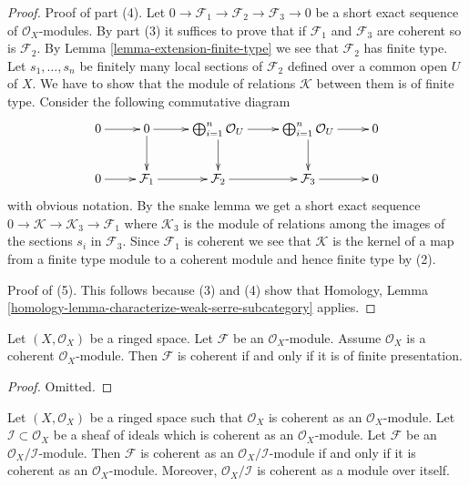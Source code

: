 \begin{proof}
\medskip\noindent
Proof of part (4).
Let $0 \to \mathcal{F}_1 \to \mathcal{F}_2 \to \mathcal{F}_3 \to 0$
be a short exact sequence of $\mathcal{O}_X$-modules. By part
(3) it suffices
to prove that if $\mathcal{F}_1$ and $\mathcal{F}_3$ are coherent
so is $\mathcal{F}_2$. By Lemma \ref{lemma-extension-finite-type} we
see that $\mathcal{F}_2$ has finite type. Let
$s_1, \ldots, s_n$ be finitely many local
sections of $\mathcal{F}_2$ defined over a common open $U$ of $X$.
We have to show that the module of relations $\mathcal{K}$
between them is of finite type.
Consider the following commutative diagram
$$
\xymatrix{
0 \ar[r] &
0 \ar[r] \ar[d] &
\bigoplus_{i = 1}^{n} \mathcal{O}_U \ar[r] \ar[d] &
\bigoplus_{i = 1}^{n} \mathcal{O}_U \ar[r] \ar[d] &
0 \\
0 \ar[r] &
\mathcal{F}_1 \ar[r] &
\mathcal{F}_2 \ar[r] &
\mathcal{F}_3 \ar[r] &
0
}
$$
with obvious notation. By the snake lemma
we get a short exact sequence
$0 \to \mathcal{K} \to \mathcal{K}_3 \to \mathcal{F}_1$
where $\mathcal{K}_3$ is the module of relations among
the images of the sections $s_i$ in $\mathcal{F}_3$.
Since $\mathcal{F}_1$ is coherent we see that
$\mathcal{K}$ is the kernel of a map from a finite type module
to a coherent module and hence finite type by (2).

\medskip\noindent
Proof of (5). This follows because (3) and (4) show that
Homology, Lemma \ref{homology-lemma-characterize-weak-serre-subcategory}
applies.
\end{proof}

\begin{lemma}
\label{lemma-coherent-structure-sheaf}
\begin{reference}
\cite[Chapter I, \S 2, no. 15, Proposition 7, p. 210]{FAC}
\end{reference}
Let $(X, \mathcal{O}_X)$ be a ringed space.
Let $\mathcal{F}$ be an $\mathcal{O}_X$-module.
Assume $\mathcal{O}_X$ is a coherent $\mathcal{O}_X$-module.
Then $\mathcal{F}$ is coherent if and only if it is
of finite presentation.
\end{lemma}

\begin{proof}
Omitted.
\end{proof}

\begin{lemma}
\label{lemma-coherent-change-rings}
\begin{reference}
\cite[Chapter I, \S 2, no. 16, Theorem 3, p. 211]{FAC}
\end{reference}
Let $(X, \mathcal{O}_X)$ be a ringed space such that $\mathcal{O}_X$ is
coherent as an $\mathcal{O}_X$-module. Let
$\mathcal{I} \subset \mathcal{O}_X$ be a sheaf of ideals which is coherent
as an $\mathcal{O}_X$-module. Let $\mathcal{F}$ be an
$\mathcal{O}_X/\mathcal{I}$-module. Then $\mathcal{F}$ is coherent as an
$\mathcal{O}_X/\mathcal{I}$-module if and only if it is coherent as an
$\mathcal{O}_X$-module. Moreover, $\mathcal{O}_X/\mathcal{I}$ is coherent
as a module over itself.
\end{lemma}

